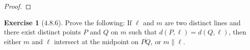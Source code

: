 \documentclass[12pt]{article}		%
\theoremstyle{definition}
\newtheorem*{ex}{Exercise}
\newcommand{\seg}[1]{\overline{#1}}
\begin{document}
\begin{proof} 
	
\end{proof}

\vspace{1in} %




\begin{ex}[4.8.6]
	Prove the following: If $\ell$ and $m$ are two distinct lines and there exist distinct points $P$ and $Q$ on $m$ such that $d(P,\ell) = d(Q,\ell)$, then either $m$ and $\ell$ intersect at the midpoint on $\seg{PQ}$, or $m \parallel \ell$.
\end{ex}



\vspace{1in} %


	
	
	
\end{document}
